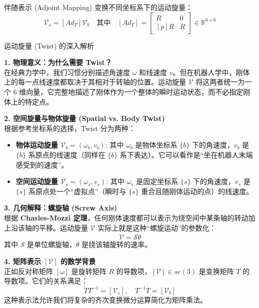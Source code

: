 \begin{mybox}{伴随表示 (Adjoint Mapping)}
变换不同坐标系下的运动旋量：
\begin{equation}
\mathcal{V}_s = [Ad_T] \mathcal{V}_b \quad \text{其中} \quad [Ad_T] = \begin{bmatrix} R & 0 \\ [p]R & R \end{bmatrix} \in \mathbb{R}^{6 \times 6}
\end{equation}
\end{mybox}

\begin{mybox}{运动旋量 (Twist) 的深入解析}

\textbf{1. 物理意义：为什么需要 Twist？} \\
在经典力学中，我们习惯分别描述角速度 $\omega$ 和线速度 $v$。但在机器人学中，刚体上的每一点线速度都取决于其相对于转轴的位置。运动旋量 $\mathcal{V}$ 将这两者统一为一个 6 维向量，它完整地描述了刚体作为一个整体的瞬时运动状态，而不必指定刚体上的特定点。

\textbf{2. 空间旋量与物体旋量 (Spatial vs. Body Twist)} \\
根据参考坐标系的选择，Twist 分为两种：
\begin{itemize}
    \item \textbf{物体运动旋量 $\mathcal{V}_b = (\omega_b, v_b)$}:
    其中 $\omega_b$ 是物体坐标系 $\{b\}$ 下的角速度，$v_b$ 是 $\{b\}$ 系原点的线速度（同样在 $\{b\}$ 系下表达）。它可以看作是“坐在机器人末端感受到的速度”。
    \item \textbf{空间运动旋量 $\mathcal{V}_s = (\omega_s, v_s)$}:
    其中 $\omega_s$ 是固定坐标系 $\{s\}$ 下的角速度，$v_s$ 是 $\{s\}$ 系原点处一个“虚拟点”（瞬时与 $\{s\}$ 重合且随刚体运动的点）的线速度。
\end{itemize}



\textbf{3. 几何解释：螺旋轴 (Screw Axis)} \\
根据 \textbf{Chasles-Mozzi 定理}，任何刚体速度都可以表示为绕空间中某条轴的转动加上沿该轴的平移。运动旋量 $\mathcal{V}$ 实际上就是这种“螺旋运动”的参数化：
\begin{equation}
    \mathcal{V} = \mathcal{S} \dot{\theta}
\end{equation}
其中 $\mathcal{S}$ 是单位螺旋轴，$\dot{\theta}$ 是绕该轴旋转的速率。

\textbf{4. 矩阵表示 $[\mathcal{V}]$ 的数学背景} \\
正如反对称矩阵 $[\omega]$ 是旋转矩阵 $R$ 的导数项，$[\mathcal{V}] \in se(3)$ 是变换矩阵 $T$ 的导数项。它们的关系满足：
\begin{equation}
    \dot{T} T^{-1} = [\mathcal{V}_s], \quad T^{-1} \dot{T} = [\mathcal{V}_b]
\end{equation}
这种表示法允许我们将复杂的齐次变换微分运算简化为矩阵乘法。


\end{mybox}
